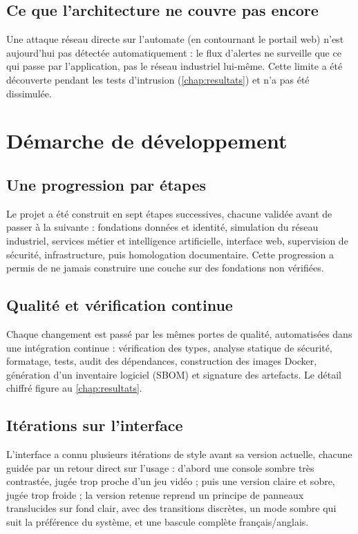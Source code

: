 \documentclass[11pt,a4paper]{report}
\begin{document}
\section{Ce que l'architecture ne couvre pas encore}
Une attaque réseau directe sur l'automate (en contournant le portail web) n'est
aujourd'hui pas détectée automatiquement : le flux d'alertes ne surveille que ce
qui passe par l'application, pas le réseau industriel lui-même. Cette limite a
été découverte pendant les tests d'intrusion (\cref{chap:resultats}) et n'a pas
été dissimulée.

\chapter{Démarche de développement}

\section{Une progression par étapes}
Le projet a été construit en sept étapes successives, chacune validée avant de
passer à la suivante : fondations données et identité, simulation du réseau
industriel, services métier et intelligence artificielle, interface web,
supervision de sécurité, infrastructure, puis homologation documentaire. Cette
progression a permis de ne jamais construire une couche sur des fondations non
vérifiées.

\section{Qualité et vérification continue}
Chaque changement est passé par les mêmes portes de qualité, automatisées dans
une intégration continue : vérification des types, analyse statique de
sécurité, formatage, tests, audit des dépendances, construction des images
Docker, génération d'un inventaire logiciel (SBOM) et signature des artefacts.
Le détail chiffré figure au \cref{chap:resultats}.

\section{Itérations sur l'interface}
L'interface a connu plusieurs itérations de style avant sa version actuelle,
chacune guidée par un retour direct sur l'usage : d'abord une console sombre
très contrastée, jugée trop proche d'un jeu vidéo ; puis une version claire et
sobre, jugée trop froide ; la version retenue reprend un principe de panneaux
translucides sur fond clair, avec des transitions discrètes, un mode sombre qui
suit la préférence du système, et une bascule complète français/anglais.
\end{document}
